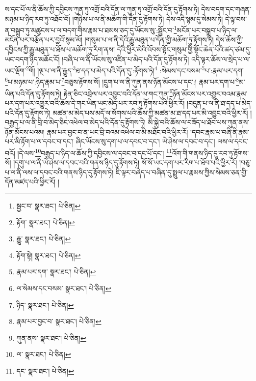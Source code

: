 ས་དང་པོ་ལ་ནི་ཆོས་ཀྱི་དབྱིངས་ཀུན་ཏུ་འགྲོ་བའི་དོན་ལ་ཀུན་ཏུ་འགྲོ་བའི་དོན་དུ་རྟོགས་ཏེ། དེས་བདག་དང་གཞན་མཉམ་པ་ཉིད་རབ་ཏུ་འཐོབ་བོ། །གཉིས་པ་ལ་ནི་མཆོག་གི་དོན་དུ་རྟོགས་ཏེ། དེས་འདི་སྙམ་དུ་སེམས་ཏེ། དེ་ལྟ་བས་ན་བསྒྲུབ་ཏུ་མཚུངས་པ་ལ་བདག་གིས་རྣམ་པ་ཐམས་ཅད་དུ་ཡོངས་སུ་:སྦྱོང་བ་\footnote{སྦྱང་བ་  སྣར་ཐང་།  པེ་ཅིན། }མངོན་པར་བསྒྲུབ་པ་ཉིད་ལ་མངོན་པར་བརྩོན་པར་བྱའོ་སྙམ་མོ། །གསུམ་པ་ལ་ནི་དེའི་རྒྱུ་མཐུན་པ་དོན་གྱི་མཆོག་ཏུ་རྟོགས་ཏེ། དེས་ཆོས་ཀྱི་དབྱིངས་ཀྱི་རྒྱུ་མཐུན་པ་ཐོས་པ་མཆོག་ཏུ་རིག་ནས། དེའི་ཕྱིར་མེའི་འོབས་སྟོང་གསུམ་གྱི་སྟོང་ཆེན་པོའི་ཚད་ཙམ་དུ་ཡང་བདག་ཉིད་མཆོང་ངོ། །བཞི་པ་ལ་ནི་ཡོངས་སུ་འཛིན་པ་མེད་པའི་དོན་དུ་རྟོགས་ཏེ། འདི་ལྟར་ཆོས་ལ་སྲེད་པ་ལ་ཡང་ལྡོག་\footnote{རྟོག་  སྣར་ཐང་།  པེ་ཅིན། }གོ། །ལྔ་པ་ལ་ནི་རྒྱུད་\footnote{རྒྱུ་  སྣར་ཐང་།  པེ་ཅིན། }ཐ་དད་པ་མེད་པའི་དོན་དུ་:རྟོགས་ཏེ།\footnote{རྟོག་སྟེ།  སྣར་ཐང་།  པེ་ཅིན། } :སེམས་དང་བསམ་\footnote{རྣམ་པར་དག་  སྣར་ཐང་།  པེ་ཅིན། }པ་:རྣམ་པར་དག་\footnote{ལ་སེམས་དང་བསམ་  སྣར་ཐང་།  པེ་ཅིན། }པ་མཉམ་པ་:ཉིད་རྣམ་པ་\footnote{ཉིད་  སྣར་ཐང་།  པེ་ཅིན། }བཅུས་རྟོགས་སོ། །དྲུག་པ་ལ་ནི་ཀུན་ནས་ཉོན་མོངས་པ་དང་:། རྣམ་པར་དག་པ་\footnote{རྣམ་པར་བྱང་བ་  སྣར་ཐང་།  པེ་ཅིན། }མ་ཡིན་པའི་དོན་དུ་རྟོགས་ཏེ། རྟེན་ཅིང་འབྲེལ་པར་འབྱུང་བའི་དོན་ལ་གང་ཀུན་\footnote{ཀུན་ནས་  སྣར་ཐང་།  པེ་ཅིན། }ཉོན་མོངས་པར་འགྱུར་བའམ་རྣམ་པར་དག་པར་འགྱུར་བའི་ཆོས་དེ་གང་ཡིན་ཡང་མེད་པར་རབ་ཏུ་རྟོགས་པའི་ཕྱིར་རོ། །བདུན་པ་ལ་ནི་ཐ་དད་པ་མེད་པའི་དོན་དུ་རྟོགས་ཏེ། མཚན་མ་མེད་པས་མདོ་ལ་སོགས་པའི་ཆོས་ཀྱི་མཚན་མ་ཐ་དད་པར་མི་འབྱུང་བའི་ཕྱིར་རོ། །བརྒྱད་པ་ལ་ནི་བྲི་བ་མེད་ཅིང་འཕེལ་བ་མེད་པའི་དོན་དུ་རྟོགས་ཏེ། མི་སྐྱེ་བའི་ཆོས་ལ་བཟོད་པ་ཐོབ་པས་ཀུན་ནས་ཉོན་མོངས་པའམ། རྣམ་པར་བྱང་བ་ན་ཡང་བྲི་བའམ་འཕེལ་བ་མི་མཐོང་བའི་ཕྱིར་རོ། །དབང་རྣམ་པ་བཞི་ནི་རྣམ་པར་མི་རྟོག་པ་ལ་དབང་བ་དང་། ཞིང་ཡོངས་སུ་དག་པ་ལ་དབང་བ་དང་། ཡེ་ཤེས་ལ་དབང་བ་དང་། ལས་ལ་དབང་བའོ། །དེ་ལས་\footnote{ལ་  སྣར་ཐང་།  པེ་ཅིན། }བརྒྱད་པ་ཉིད་ལ་ཆོས་ཀྱི་དབྱིངས་ལ་དབང་བ་དང་པོ་དང་། \footnote{དང་  སྣར་ཐང་།  པེ་ཅིན། }འོག་གི་གནས་ཉིད་དུ་རབ་ཏུ་རྟོགས་སོ། །དགུ་པ་ལ་ནི་ཡེ་ཤེས་ལ་དབང་བའི་གནས་ཉིད་དུ་རྟོགས་ཏེ། སོ་སོ་ཡང་དག་པར་རིག་པ་ཐོབ་པའི་ཕྱིར་རོ། །བཅུ་པ་ལ་ནི་ལས་ལ་དབང་བའི་གནས་ཉིད་དུ་རྟོགས་ཏེ། ཇི་ལྟར་བཞེད་པ་བཞིན་དུ་སྤྲུལ་པ་རྣམས་ཀྱིས་སེམས་ཅན་གྱི་དོན་མཛད་པའི་ཕྱིར་རོ། །
